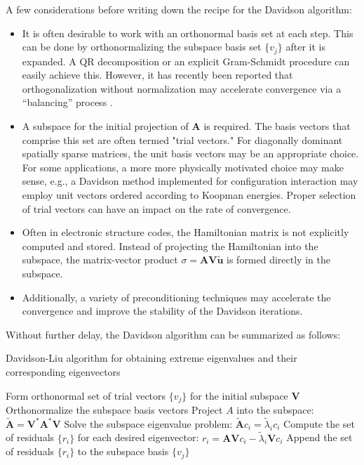\documentclass[12pt, fleqn]{article}
\begin{document}
\noindent A few considerations before writing down the recipe for the Davidson algorithm: 
\begin{itemize}
    \item It is often desirable to work with an orthonormal basis set at each step. This can be done by orthonormalizing the subspace basis set $\{v_j\}$ after it is expanded. A QR decomposition or an explicit Gram-Schmidt procedure can easily achieve this. However, it has recently been reported that orthogonalization without normalization may accelerate convergence via a ``balancing'' process \cite{Parrish2016}.
    \item A subspace for the initial projection of $\mathbf{A}$ is required. The basis vectors that comprise this set are often termed "trial vectors." For diagonally dominant spatially sparse matrices, the unit basis vectors may be an appropriate choice. For some applications, a more more physically motivated choice may make sense, e.g., a Davidson method implemented for configuration interaction may employ unit vectors ordered according to Koopman energies. Proper selection of trial vectors can have an impact on the rate of convergence.
    \item Often in electronic structure codes, the Hamiltonian matrix is not explicitly computed and stored. Instead of projecting the Hamiltonian into the subspace, the matrix-vector product $\sigma = \mathbf{A} \mathbf{V} \tilde{\mathbf{u}}$ is formed directly in the subspace. 
    \item Additionally, a variety of preconditioning techniques may accelerate the convergence and improve the stability of the Davidson iterations. 
\end{itemize}

\noindent Without further delay, the Davidson algorithm can be summarized as follows:
\begin{algorithm}
\caption{Davidson-Liu algorithm for obtaining extreme eigenvalues and their corresponding eigenvectors}
\begin{algorithmic}[1]
        \State Form orthonormal set of trial vectors $\{v_j\}$ for the initial subspace $\mathbf{V}$
            \State Orthonormalize the subspace basis vectors
            \State Project $A$ into the subspace: 
                $ \tilde{\mathbf{A}} = \mathbf{V}^* \mathbf{A}^* \mathbf{V} $
            \State Solve the subspace eigenvalue problem:
                $ \tilde{\mathbf{A}} c_i = \tilde{\lambda}_i c_i $
            \State Compute the set of residuals $\{r_i\}$ for each desired eigenvector: 
                $ r_i = \mathbf{A} \mathbf{V} c_i - \tilde{\lambda}_i \mathbf{V} c_i $
            \State Append the set of residuals $\{r_i\}$ to the subspace basis $\{v_j\}$
        \EndWhile 
    \EndProcedure
\end{algorithmic}
\end{algorithm}





\end{document}
